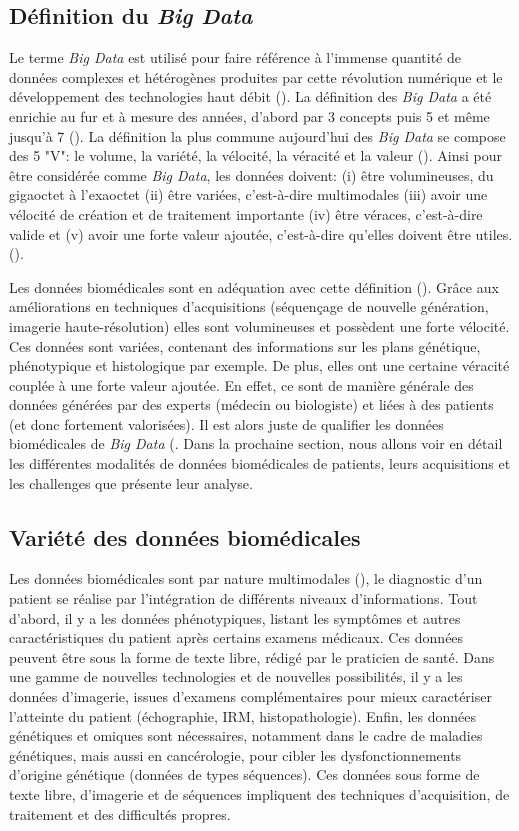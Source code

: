 \subsection{Définition du \textit{Big Data}}
Le terme \textit{Big Data} est utilisé pour faire référence à l'immense quantité de données complexes et hétérogènes produites par cette révolution numérique et le développement des technologies haut débit (\cite{de_mauro_formal_2016}). La définition des \textit{Big Data} a été enrichie au fur et à mesure des années, d'abord par 3 concepts puis 5 et même jusqu'à 7 (\cite{garcia_what_2022}). La définition la plus commune aujourd'hui des \textit{Big Data} se compose des 5 "V": le volume, la variété, la vélocité, la véracité et la valeur (\cite{ishwarappa_brief_2015}). Ainsi pour être considérée comme \textit{Big Data}, les données doivent: (i) être volumineuses, du gigaoctet à l'exaoctet (ii) être variées, c'est-à-dire multimodales (iii) avoir une vélocité de création et de traitement importante (iv) être véraces, c'est-à-dire valide et (v) avoir une forte valeur ajoutée, c'est-à-dire qu'elles doivent être utiles. (\cite{garcia_what_2022}).

Les données biomédicales sont en adéquation avec cette définition (\cite{zheng_application_2021}). Grâce aux améliorations en techniques d'acquisitions (séquençage de nouvelle génération, imagerie haute-résolution) elles sont volumineuses et possèdent une forte vélocité. Ces données sont variées, contenant des informations sur les plans génétique, phénotypique et histologique par exemple. De plus, elles ont une certaine véracité couplée à une forte valeur ajoutée. En effet, ce sont de manière générale des données générées par des experts (médecin ou biologiste) et liées à des patients (et donc fortement valorisées). Il est alors juste de qualifier les données biomédicales de \textit{Big Data} (\cite{sonawane_network_2019}. Dans la prochaine section, nous allons voir en détail les différentes modalités de données biomédicales de patients, leurs acquisitions et les challenges que présente leur analyse.

\subsection{Variété des données biomédicales}
Les données biomédicales sont par nature multimodales (\cite{acosta_multimodal_2022}), le diagnostic d'un patient se réalise par l'intégration de différents niveaux d'informations. Tout d'abord, il y a les données phénotypiques, listant les symptômes et autres caractéristiques du patient après certains examens médicaux. Ces données peuvent être sous la forme de texte libre, rédigé par le praticien de santé. Dans une gamme de nouvelles technologies et de nouvelles possibilités, il y a les données d'imagerie, issues d'examens complémentaires pour mieux caractériser l'atteinte du patient (échographie, IRM, histopathologie). Enfin, les données génétiques et omiques sont nécessaires, notamment dans le cadre de maladies génétiques, mais aussi en cancérologie, pour cibler les dysfonctionnements d'origine génétique (données de types séquences). Ces données sous forme de texte libre, d'imagerie et de séquences impliquent des techniques d'acquisition, de traitement et des difficultés propres.

